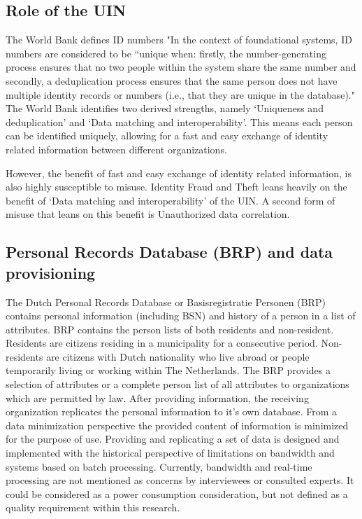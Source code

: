 \subsection{Role of the UIN}
The World Bank \cite{WorldBank_UIN} defines ID numbers "In the context of foundational systems, ID numbers are considered to be “unique when: firstly, the number-generating process ensures that no two people within the system share the same number and secondly, a deduplication process ensures that the same person does not have multiple identity records or numbers (i.e., that they are unique in the database)." The World Bank identifies two derived strengths, namely ‘Uniqueness and deduplication’ and ‘Data matching and interoperability’. This means each person can be identified uniquely, allowing for a fast and easy exchange of identity related information between different organizations.\par 
However, the benefit of fast and easy exchange of identity related information, is also highly susceptible to misuse. Identity Fraud and Theft leans heavily on the benefit of ‘Data matching and interoperability’ of the UIN. A second form of misuse that leans on this benefit is Unauthorized data correlation. \par

\subsection{Personal Records Database (BRP) and data provisioning}\label{BRP}
The Dutch Personal Records Database or Basisregistratie Personen (BRP) contains personal information (including BSN) and history of a person in a list of attributes. BRP contains the person lists of both residents and non-resident. Residents are citizens residing in a municipality for a consecutive period. Non-residents are citizens with Dutch nationality who live abroad or people temporarily living or working within The Netherlands. \cite{BRP} The BRP provides a selection of attributes or a complete person list of all attributes to organizations which are permitted by law. After providing information, the receiving organization replicates the personal information to it's own database. From a data minimization perspective the provided content of information is minimized for the purpose of use.  
Providing and replicating a set of data is designed and implemented with the historical perspective of limitations on bandwidth and systems based on batch processing. Currently, bandwidth and real-time processing are not mentioned as concerns by interviewees or consulted experts. It could be considered as a power consumption consideration, but not defined as a quality requirement within this research.

